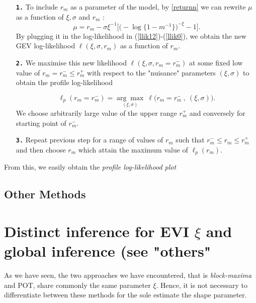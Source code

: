 \documentclass[11pt,a4paper,openany ]{book}
\begin{document}
\begin{enumerate}[label=\textbf{\arabic*})]
	
	\item[\textbf{\texttt{1.}}]  To include $r_m$ as a parameter of the model, by \ref{returnn} we can rewrite $\mu$ as a function of $\xi,\sigma$ and $r_m$ :
	\begin{equation*}
	\mu= r_m-\sigma\xi^{-1}\Big[\Big(-\log\{1-m^{-1}\}\Big)^{-\xi}-1\Big].
	\end{equation*}
	By plugging it in the log-likelihood in (\ref{llik12})-(\ref{llik0}), we obtain the new GEV log-likelihood $\ell(\xi,\sigma,r_m)$ as a function of $r_m$.
	
	\item[\textbf{\texttt{2.}}]   We maximise this new likelihood $\ell (\xi,\sigma,r_m=r^{-}_{m})$ at some fixed low value of $r_m=r^{-}_{m}\leq r^{+}_{m}$ with respect to the "nuisance" parameters $(\xi,\sigma)$ to obtain the profile log-likelihood
	
	\begin{equation*}
	\ell_p(r_m=r^{-}_{m})=\underset{(\xi,\sigma)}{\mathrm{\arg\max}}\ \ell \Big(r_m=r^{-}_{m}\ ,\ (\xi,\sigma)\Big).
	\end{equation*} 
	We choose arbitrarily large value of the upper range $r^{+}_m$ and conversely for starting point of $r^{-}_m$.
	
	\item[\textbf{\texttt{3.}}]  Repeat previous step for a range of values of $r_m$ such that $r^{-}_{m}\leq r_m\leq r^{+}_{m}$ and then choose $r_m$ which attain the maximum value of $\ell_p(r_m)$.
\end{enumerate}

From this, we easily obtain the \emph{profile log-likelihood plot} 


\subsection{Other Methods}\label{sec:gevother}

\section*{Distinct inference for EVI $\xi$ and global inference (see "others"}
\citet[pp.140]{beirlant_statistics_2006}


As we have seen, the two approaches we have encountered, that is \emph{block-maxima} and POT, share commonly the same parameter $\xi$. Hence, it is not necessary to differentiate between these methods for the sole estimate the shape parameter. 
\end{document}
